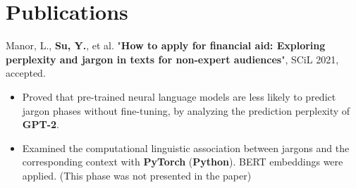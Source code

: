 \documentclass[letterpaper,11pt]{article}
\newcommand{\resumeItem}[1]{
  \item\small{
    {#1 \vspace{-2pt}}
  }
}
\newcommand{\resumeSubHeadingListStart}{\begin{itemize}[leftmargin=*]}
\newcommand{\resumeSubHeadingListEnd}{\end{itemize}}
\newcommand{\pubItemListStart}{\begin{itemize}\setlength{\itemsep}{0pt} \setlength{\parsep}{0pt} \setlength{\parskip}{0pt}}
\newcommand{\pubItemListEnd}{\end{itemize}\vspace{-5pt}}
\begin{document}
\section{Publications}
Manor, L., \textbf{Su, Y.}, et al. "\textbf{How to apply for financial aid: Exploring perplexity and jargon in texts for non-expert audiences}", SCiL 2021, accepted.  
\pubItemListStart
	\vspace{-7pt}\resumeItem{Proved that pre-trained neural language models are less likely to predict jargon phases without fine-tuning, by analyzing the prediction perplexity of \textbf{GPT-2}.}
	\resumeItem{Examined the computational linguistic association between jargons and the corresponding context with \textbf{PyTorch} (\textbf{Python}). BERT embeddings were applied. (This phase was not presented in the paper)}
	
\pubItemListEnd

%


%


\end{document}
